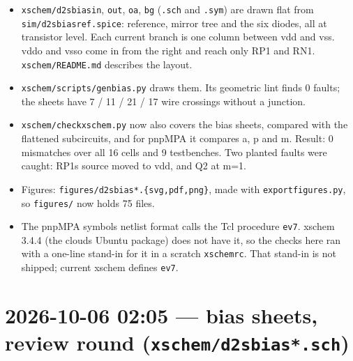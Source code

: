 \documentclass[11pt,a4paper]{article}
\providecommand{\tightlist}{\setlength{\itemsep}{0pt}\setlength{\parskip}{0pt}}
\renewcommand{\_}{\textunderscore\hspace{0pt}}
\begin{document}
\begin{itemize}
\tightlist
\item
  \texttt{xschem/d2s\_bias\_in}, \texttt{\_out},
  \texttt{\_oa}, \texttt{\_bg} (\texttt{.sch} and
  \texttt{.sym}) are drawn flat from
  \texttt{sim/d2s\_bias\_ref.spice}: reference,
  mirror tree and the six diodes, all at
  transistor level. Each current branch is one
  column between vdd and vss. vddo and vsso come
  in from the right and reach only RP1 and RN1.
  \texttt{xschem/README.md} describes the layout.
\item
  \texttt{xschem/scripts/gen\_bias.py} draws them.
  Its geometric lint finds 0 faults; the sheets
  have 7 / 11 / 21 / 17 wire crossings without a
  junction.
\item
  \texttt{xschem/check\_xschem.py} now also covers
  the bias sheets, compared with the flattened
  subcircuits, and for pnpMPA it compares a, p and
  m. Result: 0 mismatches over all 16 cells and 9
  testbenches. Two planted faults were caught:
  RP1\textquotesingle s source moved to vdd, and
  Q2 at m=1.
\item
  Figures:
  \texttt{figures/d2s\_bias\_*.\{svg,pdf,png\}},
  made with \texttt{export\_figures.py}, so
  \texttt{figures/} now holds 75 files.
\item
  The pnpMPA symbol\textquotesingle s netlist
  format calls the Tcl procedure \texttt{ev7}.
  xschem 3.4.4 (the cloud\textquotesingle s Ubuntu
  package) does not have it, so the checks here
  ran with a one-line stand-in for it in a scratch
  \texttt{xschemrc}. That stand-in is not shipped;
  current xschem defines \texttt{ev7}.
\end{itemize}

\hypertarget{2026-10-06-0205--bias-sheets-review-round-xschemd2s_bias_sch}{%
\section{\texorpdfstring{2026-10-06 02:05 --- bias
sheets, review round
(\texttt{xschem/d2s\_bias\_*.sch})}{2026-10-06 02:05 --- bias sheets, review round (xschem/d2s\_bias\_*.sch)}}\label{2026-10-06-0205--bias-sheets-review-round-xschemd2s_bias_sch}}
\end{document}
